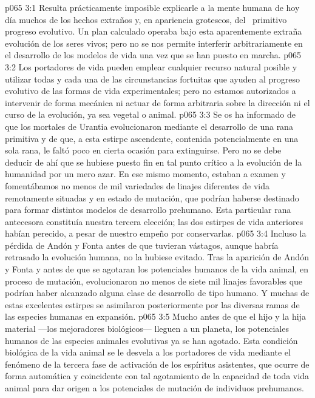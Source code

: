 \vs p065 3:1 Resulta prácticamente imposible explicarle a la mente humana de hoy día muchos de los hechos extraños y, en apariencia grotescos, del  primitivo progreso evolutivo. Un plan calculado operaba bajo esta aparentemente extraña evolución de los seres vivos; pero no se nos permite interferir arbitrariamente en el desarrollo de los modelos de vida una vez que se han puesto en marcha.
\vs p065 3:2 \pc Los portadores de vida pueden emplear cualquier recurso natural posible y utilizar todas y cada una de las circunstancias fortuitas que ayuden al progreso evolutivo de las formas de vida experimentales; pero no estamos autorizados a intervenir de forma mecánica ni actuar de forma arbitraria sobre la dirección ni el curso de la evolución, ya sea vegetal o animal.
\vs p065 3:3 Se os ha informado de que los mortales de Urantia evolucionaron mediante el desarrollo de una rana primitiva y de que, a esta estirpe ascendente, contenida potencialmente en una sola rana, le faltó poco en cierta ocasión para extinguirse. Pero no se debe deducir de ahí que se hubiese puesto fin en tal punto crítico a la evolución de la humanidad por un mero azar. En ese mismo momento, estaban a examen y fomentábamos no menos de mil variedades de linajes diferentes de vida remotamente situadas y en estado de mutación, que podrían haberse destinado para formar distintos modelos de desarrollo prehumano. Esta particular rana antecesora constituía nuestra tercera elección; las dos estirpes de vida anteriores habían perecido, a pesar de nuestro empeño por conservarlas.
\vs p065 3:4 \pc Incluso la pérdida de Andón y Fonta antes de que tuvieran vástagos, aunque habría retrasado la evolución humana, no la hubiese evitado. Tras la aparición de Andón y Fonta y antes de que se agotaran los potenciales humanos de la vida animal, en proceso de mutación, evolucionaron no menos de siete mil linajes favorables que podrían haber alcanzado alguna clase de desarrollo de tipo humano. Y muchas de estas excelentes estirpes se asimilaron posteriormente por las diversas ramas de las especies humanas en expansión.
\vs p065 3:5 Mucho antes de que el hijo y la hija material ---los mejoradores biológicos--- lleguen a un planeta, los potenciales humanos de las especies animales evolutivas ya se han agotado. Esta condición biológica de la vida animal se le desvela a los portadores de vida mediante el fenómeno de la tercera fase de activación de los espíritus asistentes, que ocurre de forma automática y coincidente con tal agotamiento de la capacidad de toda vida animal para dar origen a los potenciales de mutación de individuos prehumanos.

